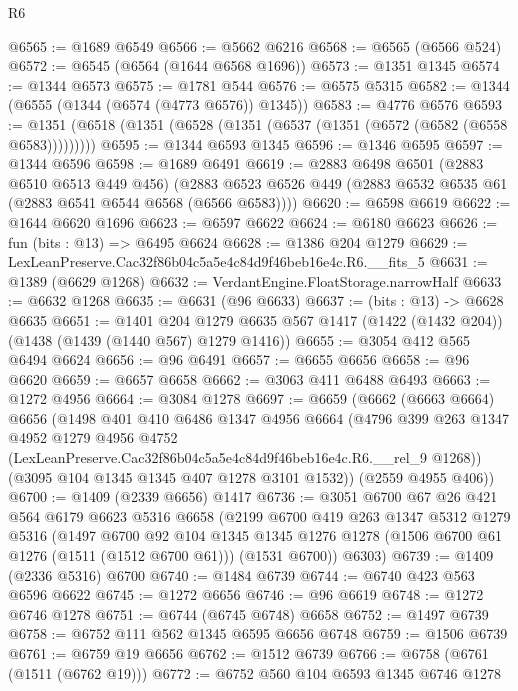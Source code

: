 \begin{lexlean}{R6}
\begin{coremodule}
@6565 := @1689 @6549
@6566 := @5662 @6216
@6568 := @6565 (@6566 @524)
@6572 := @6545 (@6564 (@1644 @6568 @1696))
@6573 := @1351 @1345
@6574 := @1344 @6573
@6575 := @1781 @544
@6576 := @6575 @5315
@6582 := @1344 (@6555 (@1344 (@6574 (@4773 @6576)) @1345))
@6583 := @4776 @6576
@6593 := @1351 (@6518 (@1351 (@6528 (@1351 (@6537 (@1351 (@6572 (@6582 (@6558 @6583)))))))))
@6595 := @1344 @6593 @1345
@6596 := @1346 @6595
@6597 := @1344 @6596
@6598 := @1689 @6491
@6619 := @2883
    @6498
    @6501
    (@2883 @6510 @6513 @449 @456)
    (@2883 @6523 @6526 @449 (@2883 @6532 @6535 @61 (@2883 @6541 @6544 @6568 (@6566 @6583))))
@6620 := @6598 @6619
@6622 := @1644 @6620 @1696
@6623 := @6597 @6622
@6624 := @6180 @6623
@6626 := fun (bits : @13) => @6495 @6624
@6628 := @1386 @204 @1279
@6629 := LexLeanPreserve.Cac32f86b04c5a5e4c84d9f46beb16e4c.R6.__fits_5
@6631 := @1389 (@6629 @1268)
@6632 := VerdantEngine.FloatStorage.narrowHalf
@6633 := @6632 @1268
@6635 := @6631 (@96 @6633)
@6637 := (bits : @13) -> @6628 @6635
@6651 := @1401
    @204
    @1279
    @6635
    @567
    @1417
    (@1422 (@1432 @204))
    (@1438 (@1439 (@1440 @567) @1279 @1416))
@6655 := @3054 @412 @565 @6494 @6624
@6656 := @96 @6491
@6657 := @6655 @6656
@6658 := @96 @6620
@6659 := @6657 @6658
@6662 := @3063 @411 @6488 @6493
@6663 := @1272 @4956
@6664 := @3084 @1278
@6697 := @6659
    (@6662
      (@6663 @6664)
      @6656
      (@1498
        @401
        @410
        @6486
        @1347
        @4956
        @6664
        (@4796
          @399
          @263
          @1347
          @4952
          @1279
          @4956
          @4752
          (LexLeanPreserve.Cac32f86b04c5a5e4c84d9f46beb16e4c.R6.__rel_9 @1268))
        (@3095 @104 @1345 @1345 @407 @1278 @3101 @1532))
      (@2559 @4955 @406))
@6700 := @1409 (@2339 @6656) @1417
@6736 := @3051
    @6700
    @67
    @26
    @421
    @564
    @6179
    @6623
    @5316
    @6658
    (@2199
      @6700
      @419
      @263
      @1347
      @5312
      @1279
      @5316
      (@1497
        @6700
        @92
        @104
        @1345
        @1345
        @1276
        @1278
        (@1506 @6700 @61 @1276 (@1511 (@1512 @6700 @61)))
        (@1531 @6700))
      @6303)
@6739 := @1409 (@2336 @5316) @6700
@6740 := @1484 @6739
@6744 := @6740 @423 @563 @6596 @6622
@6745 := @1272 @6656
@6746 := @96 @6619
@6748 := @1272 @6746 @1278
@6751 := @6744 (@6745 @6748) @6658
@6752 := @1497 @6739
@6758 := @6752 @111 @562 @1345 @6595 @6656 @6748
@6759 := @1506 @6739
@6761 := @6759 @19 @6656
@6762 := @1512 @6739
@6766 := @6758 (@6761 (@1511 (@6762 @19)))
@6772 := @6752 @560 @104 @6593 @1345 @6746 @1278

\end{coremodule}
\end{lexlean}
